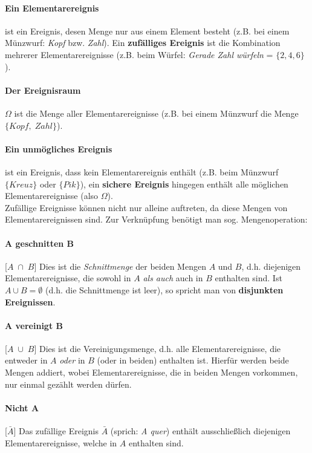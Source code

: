 \documentclass[a4paper]{article}
\begin{document}
\paragraph{Ein Elementarereignis} ist ein Ereignis, desen Menge nur aus einem Element besteht (z.B. bei einem Münzwurf: \textit{Kopf} bzw. \textit{Zahl}). Ein \textbf{zufälliges Ereignis} ist die Kombination mehrerer Elementarereignisse (z.B. beim Würfel: \textit{Gerade Zahl würfeln} = $\{2,4,6\}$).
\paragraph{Der Ereignisraum} $\Omega$ ist die Menge aller Elementarereignisse (z.B. bei einem Münzwurf die Menge $\{Kopf,\; Zahl\}$).
\paragraph{Ein unmögliches Ereignis} ist ein Ereignis, dass kein Elementarereignis enthält (z.B. beim Münzwurf $\{Kreuz\}$ oder $\{Pik\}$), ein \textbf{sichere Ereignis} hingegen enthält alle möglichen Elementarereignisse (also $\Omega$).\\

\noindent Zufällige Ereignisse können nicht nur alleine auftreten, da diese Mengen von Elementarereignissen sind. Zur Verknüpfung benötigt man sog. Mengenoperation:

\paragraph{A geschnitten B} [$A\; \cap\; B$]\; Dies ist die \textit{Schnittmenge} der beiden Mengen $A$ und $B$, d.h. diejenigen Elementarereignisse, die sowohl in $A$ \textit{als auch} auch in $B$ enthalten sind. Ist $A\cup B=\emptyset$ (d.h. die Schnittmenge ist leer), so spricht man von \textbf{disjunkten Ereignissen}. 

\paragraph{A vereinigt B} [$A\; \cup\; B$]\; Dies ist die Vereinigungsmenge, d.h. alle Elementarereignisse, die entweder in $A$ \textit{oder} in $B$ (oder in beiden) enthalten ist. Hierfür werden beide Mengen addiert, wobei Elementarereignisse, die in beiden Mengen vorkommen, nur einmal gezählt werden dürfen.

\paragraph{Nicht A} [$\bar A$]\; Das zufällige Ereignis $\bar A$ (sprich: \textit{A quer}) enthält ausschließlich diejenigen Elementarereignisse, welche in $A$ enthalten sind.
\end{document}
